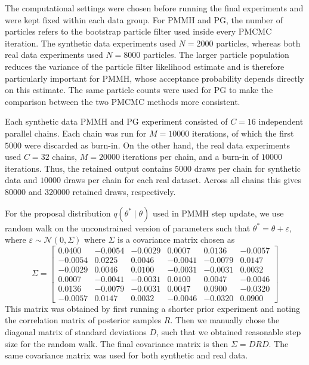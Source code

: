 The computational settings were chosen before running the final experiments and
were kept fixed within each data group.  For PMMH and PG, the number of
particles refers to the bootstrap particle filter used inside every
PMCMC iteration. The synthetic data experiments used $N=2000$
particles, whereas both real data experiments used $N=8000$ particles.
The larger particle population reduces the variance of the particle filter
likelihood estimate and is therefore particularly important for PMMH, whose
acceptance probability depends directly on this estimate.  The same particle
counts were used for PG to make the comparison between the two PMCMC
methods more consistent.

Each synthetic data PMMH and PG experiment consisted of $C=16$ independent
parallel chains.  Each chain was run for $M=10000$ iterations, of which the
first $5000$ were discarded as burn-in. On the other hand, the
real data experiments used $C=32$ chains, $M=20000$ iterations per chain, and a burn-in
of $10000$ iterations.  Thus, the retained output contains $5000$ draws per
chain for synthetic data and $10000$ draws per chain for each real dataset.
Across all chains this gives 80000 and 320000 retained draws, respectively.

For the proposal distribution $q(\theta^* \mid \theta)$ used in PMMH step update, we use random walk on the unconstrained
version of parameters such that $\theta^* = \theta + \varepsilon$, where $\varepsilon \sim \mathcal{N}(0, \Sigma)$ where 
$\Sigma$ is a covariance matrix chosen as
\[
\Sigma = \begin{bmatrix}
0.0400 & -0.0054 & -0.0029 & 0.0007 & 0.0136 & -0.0057 \\
-0.0054 & 0.0225 & 0.0046 & -0.0041 & -0.0079 & 0.0147 \\
-0.0029 & 0.0046 & 0.0100 & -0.0031 & -0.0031 & 0.0032 \\
0.0007 & -0.0041 & -0.0031 & 0.0100 & 0.0047 & -0.0046 \\
0.0136 & -0.0079 & -0.0031 & 0.0047 & 0.0900 & -0.0320 \\
-0.0057 & 0.0147 & 0.0032 & -0.0046 & -0.0320 & 0.0900
\end{bmatrix}
\]
This matrix was obtained by first running a shorter prior experiment and noting the correlation matrix of posterior samples $R$. Then we manually chose the diagonal matrix of standard deviations $D$, 
such that we obtained reasonable step size for the random walk. The final covariance matrix is then $\Sigma = DRD$. The same covariance matrix was used for both synthetic and real data.

